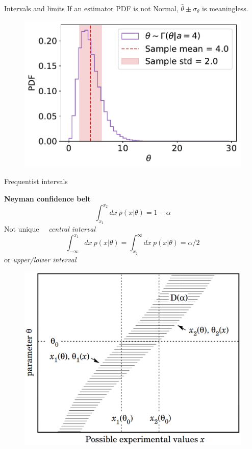 \documentclass[
aspectratio=169,
14pt,
professionalfonts
]{beamer}
\newcommand{\arrow}{~\ding{220}~}
\begin{document}
\begin{frame}{Intervals and limits}
If an estimator PDF is not Normal, $\hat \theta \pm \sigma_\theta$ is meaningless.

\begin{figure}
    \centering
    \includegraphics[width=0.6\linewidth]{../plots/gamma.pdf}
\end{figure}
\end{frame}

\begin{frame}{Frequentist intervals}

\begin{minipage}[t]{0.55\linewidth}
\textbf{Neyman confidence belt}
$$
\int_{x_1}^{x_2} dx ~ p(x|\theta) = 1-\alpha
$$
Not unique \arrow \textit{central interval}
\small
$$
\int_{-\infty}^{x_1} dx ~ p(x|\theta)=  \int_{x_2}^{\infty} dx ~ p(x|\theta) = \alpha/2
$$
\normalsize
or \textit{upper/lower interval}
\end{minipage}
\begin{minipage}[t]{0.44\linewidth}
    \begin{figure}
        \centering
        \includegraphics[width=\linewidth]{../plots/neyman.png}
    \end{figure}
\end{minipage}
\end{frame}
\end{document}
